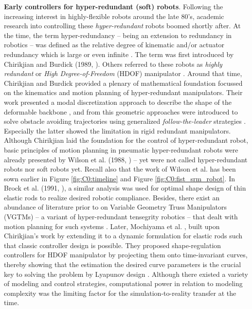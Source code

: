 \par \textbf{Early controllers for hyper-redundant (soft) robots}. Following the increasing interest in highly-flexible robots around the late 80's, academic research into controlling these \textit{hyper-redundant} robots boomed shortly after. At the time, the term hyper-redundancy -- being an extension to redundancy in robotics \cite{MerriamWebster1983} -- was defined as the relative degree of kinematic and/or actuator redundancy which is large or even infinite \cite{Chirikjian1992,Chirikjian1994}. The term was first introduced by Chirikjian and Burdick (1989, \cite{Chirikjian1989}). Others referred to these robots as \textit{highly redundant} \cite{Wilson1988Dec,Naccarato1989Dec} or \textit{High Degree-of-Freedom} (HDOF) manipulator \cite{Salerno1989Jan,Mochiyama1999}. Around that time, Chirikjian and Burdick provided a plenary of mathematical foundation \cite{Chirikjian1994,Chirikjian1994Jun,Chirikjian1991,Chirikjian1992,Chirikjian1992Dec} focussed on the kinematics and motion planning of hyper-redundant manipulators. Their work presented a modal discretization approach to describe the shape of the deformable backbone \cite{Chirikjian1994Jun}, and from this geometric approaches were introduced to solve obstacle avoiding trajectories using generalized \textit{follow-the-leader} strategies \cite{Chirikjian1992Dec}. Especially the latter showed the limitation in rigid redundant manipulators. Although Chirikjian laid the foundation for the control of hyper-redundant robot, basic principles of motion planning in pneumatic hyper-redundant robots were already presented by Wilson et al. (1988, \cite{Wilson1988Dec,Wilson1989Jun}) -- yet were not called hyper-redundant robots nor soft robots yet. Recall also that the work of Wilson et al. has been sown earlier in Figure \ref{fig:C0:timeline} and Figure \ref{fig:C0:fist_srm_robot}. In Brock et al. (1991, \cite{Brock1991}), a similar analysis was used for optimal shape design of thin elastic rods to realize desired robotic compliance. Besides, there exist an abundance of literature prior to \cite{Chirikjian1992} on Variable Geometry Truss Manipulators (VGTMs) -- a variant of hyper-redundant tensegrity robotics -- that dealt with motion planning for such systems \cite{Naccarato1989Dec,Naccarato1991Apr,Salerno1989Jan}. Later, Mochiyama et al. \cite{Mochiyama1998,Mochiyama1999}, built upon Chirikjian's work by extending it to a dynamic formulation for elastic rods such that classic controller design is possible. They proposed shape-regulation controllers for HDOF manipulator by projecting them onto time-invariant curves, thereby showing that the estimation the desired curve parameters is the crucial key to solving the problem by Lyapunov design \cite{Mochiyama1998}. Although there existed a variety of modeling and control strategies, computational power in relation to modeling complexity was the limiting factor for the simulation-to-reality transfer at the time.

